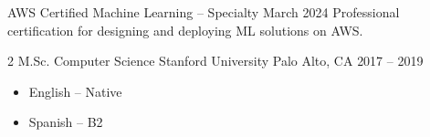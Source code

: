 \documentclass[10pt, a4paper]{cfcv}
\begin{document}

\cvachievement{\certificatesymbol}
  {AWS Certified Machine Learning – Specialty}             %
  {March 2024}                                             %
  {Professional certification for designing and deploying ML solutions on AWS.}
\par\smallskip
{}

\begin{multicols}{2}
  \education
    {M.Sc. Computer Science}     %
    {Stanford University}        %
    {Palo Alto, CA}              %
    {2017 – 2019}                %

  \columnbreak

  \begin{itemize}
    \item English – Native       %
    \item Spanish – B2           %
  \end{itemize}
\end{multicols}
\end{document}
